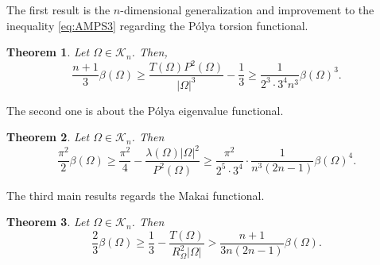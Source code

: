 \documentclass[oneside,a4paper,11pt,notitlepage]{article}
\newcommand{\abs}[1]{{\left|#1\right|}}
\theoremstyle{definition}
\theoremstyle{plain}
\newtheorem{teorema}{Theorem}[section]
\theoremstyle{definition}
\begin{document}
The first result is the $n$-dimensional generalization and improvement to the inequality \eqref{eq:AMPS3} regarding the P\'olya torsion functional.

\begin{teorema} \label{thm:quantitative_PRM}
Let $\Omega\in \mathcal{K}_n$. Then, 
 \begin{equation}\label{eq:TPM-PRM}
         \frac{n+1}{3}\beta(\Omega)\ge 
         \frac{T(\Omega) P^2(\Omega)}{\abs{\Omega}^3}-\frac{1}{3} \ge \frac{1}{2^3\cdot 3^4 n^3} \beta(\Omega)^3.
    \end{equation}
\end{teorema}
\vspace{0.5cm}
\noindent The second one is about the P\'olya eigenvalue functional.

\begin{teorema}\label{thm:quantitative_lambdapr}
Let $\Omega\in \mathcal{K}_n$. Then
\begin{equation}\label{quantitative_HMP-PRM}
\frac{\pi^2}{2}\beta(\Omega)\ge  \frac{\pi^2}{4} -\frac{\lambda( \Omega) \abs{\Omega}^2}{P^2(\Omega)}  \ge \frac{\pi^2}{2^5\cdot 3^4}\cdot\frac{1}{n^3(2n-1)}\beta(\Omega)^4.
\end{equation}

\end{teorema}
\vspace{0.5cm}
\noindent The third main results regards the Makai functional.
\begin{teorema} \label{thm:quantitative_torsionmakai_PRM}
Let $\Omega\in \mathcal{K}_n$. Then
\begin{equation}\label{eq:quantitative_PRM_torsion_makai}
\frac{2}{3}\beta(\Omega)\ge\frac{1}{3}-\frac{T(\Omega)}{R_{\Omega}^2\abs{\Omega}}>\frac{n+1}{3n(2n-1)}\beta(\Omega).
\end{equation}
\end{teorema}
\end{document}
